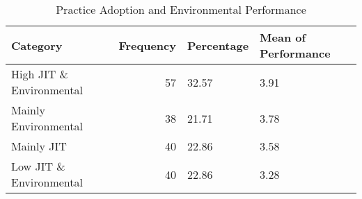 \begin{table}[htbp]
    \centering
    \caption{Practice Adoption and Environmental Performance}
    \label{tab:your_label}
    \begin{tabular}{lrll}
\toprule
Category & Frequency & Percentage & Mean of Performance \\
\midrule
High JIT \& Environmental & 57 & 32.57 & 3.91 \\
Mainly Environmental & 38 & 21.71 & 3.78 \\
Mainly JIT & 40 & 22.86 & 3.58 \\
Low JIT \& Environmental & 40 & 22.86 & 3.28 \\
\bottomrule
\end{tabular}

    \end{table}
    